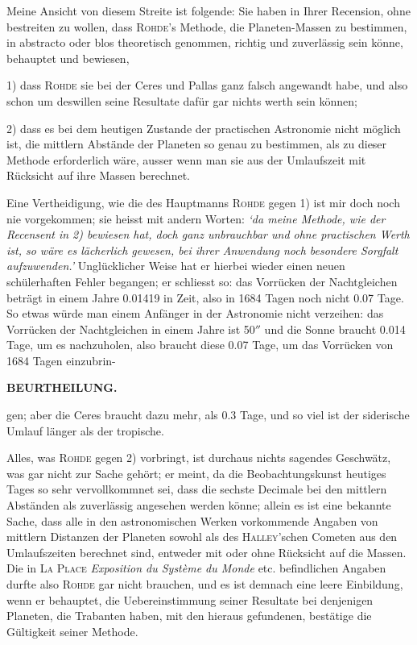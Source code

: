 Meine Ansicht von diesem Streite ist folgende: Sie haben in Ihrer Recension, ohne bestreiten zu wollen, dass \textsc{Rohde}'s Methode, die Planeten-Massen zu bestimmen, in abstracto oder blos theoretisch genommen, richtig und zuverlässig sein könne, behauptet und bewiesen,

1) dass \textsc{Rohde} sie bei der Ceres und Pallas ganz falsch angewandt habe, und also schon um deswillen seine Resultate dafür gar nichts werth sein können;

2) dass es bei dem heutigen Zustande der practischen Astronomie nicht möglich ist, die mittlern Abstände der Planeten so genau zu bestimmen, als zu dieser Methode erforderlich wäre, ausser wenn man sie aus der Umlaufszeit mit Rücksicht auf ihre Massen berechnet.

Eine Vertheidigung, wie die des Hauptmanns \textsc{Rohde} gegen 1) ist mir doch noch nie vorgekommen; sie heisst mit andern Worten: \emph{`da meine Methode, wie der Recensent in 2) bewiesen hat, doch ganz unbrauchbar und ohne practischen Werth ist, so wäre es lächerlich gewesen, bei ihrer Anwendung noch besondere Sorgfalt aufzuwenden.'} Unglücklicher Weise hat er hierbei wieder einen neuen schülerhaften Fehler begangen; er schliesst so: das Vorrücken der Nachtgleichen beträgt in einem Jahre 0.01419 in Zeit, also in 1684 Tagen noch nicht 0.07 Tage. So etwas würde man einem Anfänger in der Astronomie nicht verzeihen: das Vorrücken der Nachtgleichen in einem Jahre ist 50$''$ und die Sonne braucht 0.014 Tage, um es nachzuholen, also braucht diese 0.07 Tage, um das Vorrücken von 1684 Tagen einzubrin-\par
\clearpage
\thispagestyle{empty}
\noindent{}%
%
\parbox[t]{\dimexpr\linewidth-24mm\relax}{\centering\footnotesize\bfseries BEURTHEILUNG.\par}%
\makebox[12mm][r]{}\par\nobreak\medskip
\noindent gen; aber die Ceres braucht dazu mehr, als 0.3 Tage, und so viel ist der siderische Umlauf länger als der tropische.

Alles, was \textsc{Rohde} gegen 2) vorbringt, ist durchaus nichts sagendes Geschwätz, was gar nicht zur Sache gehört; er meint, da die Beobachtungskunst heutiges Tages so sehr vervollkommnet sei, dass die sechste Decimale bei den mittlern Abständen als zuverlässig angesehen werden könne; allein es ist eine bekannte Sache, dass alle in den astronomischen Werken vorkommende Angaben von mittlern Distanzen der Planeten sowohl als des \textsc{Halley}'schen Cometen aus den Umlaufszeiten berechnet sind, entweder mit oder ohne Rücksicht auf die Massen. Die in \textsc{La Place} \emph{Exposition du Système du Monde} etc. befindlichen Angaben durfte also \textsc{Rohde} gar nicht brauchen, und es ist demnach eine leere Einbildung, wenn er behauptet, die Uebereinstimmung seiner Resultate bei denjenigen Planeten, die Trabanten haben, mit den hieraus gefundenen, bestätige die Gültigkeit seiner Methode.

